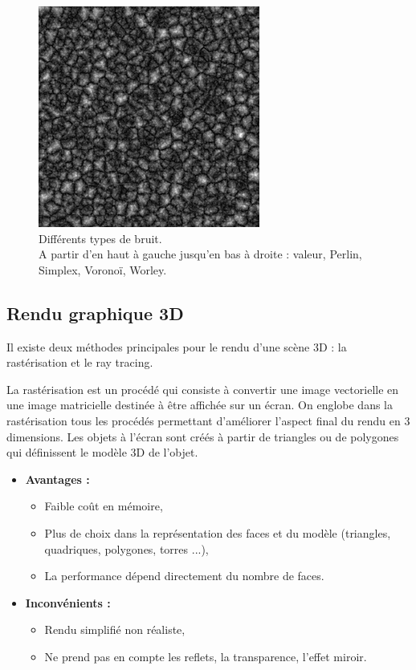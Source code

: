 \documentclass[a4paper]{article}
\begin{document}
\begin{figure}[!h]
\begin{center}
     \end{center}
     \begin{center}
    \includegraphics[width=0.4\linewidth]{img/noise/worley.png}
    \end{center}
        \caption{\label{noises}Différents types de bruit\protect\footnotemark.\\
        A partir d'en haut à gauche jusqu'en bas à droite : valeur, Perlin, Simplex, Voronoï, Worley.}
    \end{figure}


\newpage
\subsection{Rendu graphique 3D} \label{raster/ray}

Il existe deux méthodes principales pour le rendu d'une scène 3D : la rastérisation et le ray tracing.

            La rastérisation est un procédé qui consiste à convertir une image vectorielle en une image matricielle destinée à être affichée sur un écran. On englobe dans la rastérisation tous les procédés permettant d'améliorer l'aspect final du rendu en 3 dimensions.
            Les objets à l'écran sont créés à partir de triangles ou de polygones qui définissent le modèle 3D de l'objet.
            \begin{itemize}
                \item \textbf{Avantages :}
                \begin{itemize}
                    \item Faible coût en mémoire,
                    \item Plus de choix dans la représentation des faces et du modèle (triangles, quadriques, polygones, torres ...),
                    \item La performance dépend directement du nombre de faces.
                \end{itemize}
                \item  \textbf{Inconvénients :}
                \begin{itemize}
                    \item Rendu simplifié non réaliste,
                    \item Ne prend pas en compte les reflets, la transparence, l'effet miroir.
                \end{itemize}
            \end{itemize}
        
\end{document}
